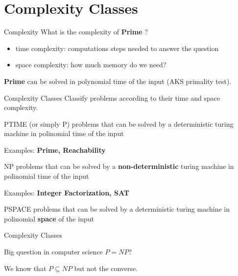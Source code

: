 \documentclass[c]{beamer}
\begin{document}
\section{Complexity Classes}
\begin{frame}{Complexity}
      What is the complexity of \textbf{Prime} ?
	 \begin{itemize}
			\item time complexity: computations steps needed to answer the question
			\item space complexity: how much memory do we need?
	 \end{itemize}
	 
	 \textbf{Prime} can be solved in polynomial time of the input (AKS primality test).
	 
	 
	 
\end{frame}

\begin{frame}{Complexity Classes}
    Classify problems according to their time and space complexity.
	\begin{block}{PTIME (or simply P)}
		problems that can be solved by a deterministic turing machine in polinomial time of the input
    \end{block}
    Examples: \textbf{Prime, Reachability}
    \begin{block}{NP}
		problems that can be solved by a \textbf{non-deterministic} turing machine in polinomial time of the input
    \end{block}
    Examples: \textbf{Integer Factorization, SAT}
    \begin{block}{PSPACE}
		problems that can be solved by a deterministic turing machine in polinomial \textbf{space} of the input
    \end{block}
    
\end{frame}

\begin{frame}{Complexity Classes}
 
 \begin{block}{Big question in computer science}
 	$P=NP$?
 \end{block}
 We know that $ P \subseteq NP$ but not the converse. 
\end{frame}
\end{document}
